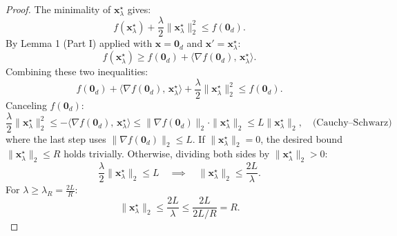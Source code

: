 \begin{proof}
The minimality of $\mathbf{x}_\lambda^\star$ gives:
\[
f(\mathbf{x}_\lambda^\star) + \frac{\lambda}{2}\|\mathbf{x}_\lambda^\star\|_2^2 \leq f(\mathbf{0}_d).
\]
By Lemma 1 (Part I) applied with $\mathbf{x} = \mathbf{0}_d$ and $\mathbf{x}' = \mathbf{x}_\lambda^\star$:
\[
f(\mathbf{x}_\lambda^\star) \geq f(\mathbf{0}_d) + \langle \nabla f(\mathbf{0}_d),\, \mathbf{x}_\lambda^\star \rangle.
\]
Combining these two inequalities:
\[
f(\mathbf{0}_d) + \langle \nabla f(\mathbf{0}_d),\, \mathbf{x}_\lambda^\star \rangle + \frac{\lambda}{2}\|\mathbf{x}_\lambda^\star\|_2^2 \leq f(\mathbf{0}_d).
\]
Canceling $f(\mathbf{0}_d)$:
\[
\frac{\lambda}{2}\|\mathbf{x}_\lambda^\star\|_2^2 \leq -\langle \nabla f(\mathbf{0}_d),\, \mathbf{x}_\lambda^\star \rangle \leq \|\nabla f(\mathbf{0}_d)\|_2 \cdot \|\mathbf{x}_\lambda^\star\|_2 \leq L\|\mathbf{x}_\lambda^\star\|_2, \quad \text{(Cauchy--Schwarz)}
\]
where the last step uses $\|\nabla f(\mathbf{0}_d)\|_2 \leq L$. If $\|\mathbf{x}_\lambda^\star\|_2 = 0$, the desired bound $\|\mathbf{x}_\lambda^\star\|_2 \leq R$ holds trivially. Otherwise, dividing both sides by $\|\mathbf{x}_\lambda^\star\|_2 > 0$:
\[
\frac{\lambda}{2}\|\mathbf{x}_\lambda^\star\|_2 \leq L \quad \implies \quad \|\mathbf{x}_\lambda^\star\|_2 \leq \frac{2L}{\lambda}.
\]
For $\lambda \geq \lambda_R = \frac{2L}{R}$:
\[
\|\mathbf{x}_\lambda^\star\|_2 \leq \frac{2L}{\lambda} \leq \frac{2L}{2L/R} = R.
\]
\end{proof}
